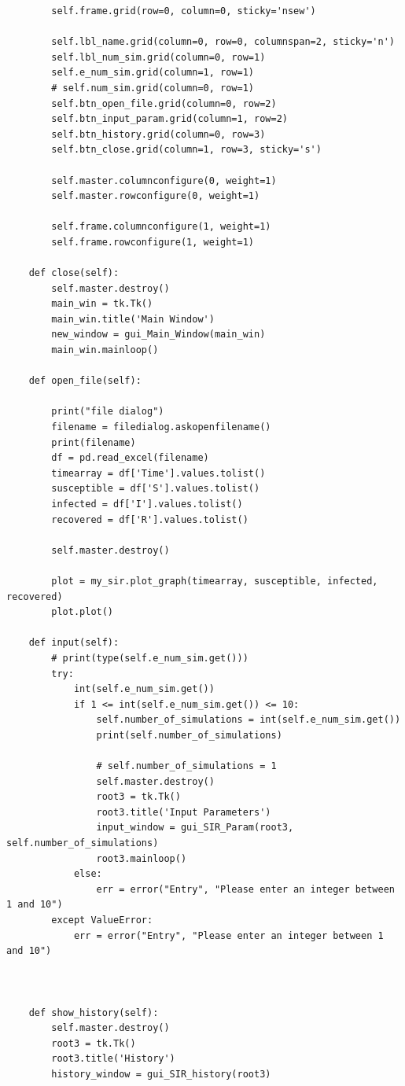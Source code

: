 \documentclass[11pt, a4paper]{article}
\begin{document}
\begin{lstlisting}
        self.frame.grid(row=0, column=0, sticky='nsew')

        self.lbl_name.grid(column=0, row=0, columnspan=2, sticky='n')
        self.lbl_num_sim.grid(column=0, row=1)
        self.e_num_sim.grid(column=1, row=1)
        # self.num_sim.grid(column=0, row=1)
        self.btn_open_file.grid(column=0, row=2)
        self.btn_input_param.grid(column=1, row=2)
        self.btn_history.grid(column=0, row=3)
        self.btn_close.grid(column=1, row=3, sticky='s')

        self.master.columnconfigure(0, weight=1)
        self.master.rowconfigure(0, weight=1)

        self.frame.columnconfigure(1, weight=1)
        self.frame.rowconfigure(1, weight=1)

    def close(self):
        self.master.destroy()
        main_win = tk.Tk()
        main_win.title('Main Window')
        new_window = gui_Main_Window(main_win)
        main_win.mainloop()

    def open_file(self):

        print("file dialog")
        filename = filedialog.askopenfilename()
        print(filename)
        df = pd.read_excel(filename)
        timearray = df['Time'].values.tolist()
        susceptible = df['S'].values.tolist()
        infected = df['I'].values.tolist()
        recovered = df['R'].values.tolist()

        self.master.destroy()

        plot = my_sir.plot_graph(timearray, susceptible, infected, recovered)
        plot.plot()

    def input(self):
        # print(type(self.e_num_sim.get()))
        try:
            int(self.e_num_sim.get())
            if 1 <= int(self.e_num_sim.get()) <= 10:
                self.number_of_simulations = int(self.e_num_sim.get())
                print(self.number_of_simulations)

                # self.number_of_simulations = 1
                self.master.destroy()
                root3 = tk.Tk()
                root3.title('Input Parameters')
                input_window = gui_SIR_Param(root3, self.number_of_simulations)
                root3.mainloop()
            else:
                err = error("Entry", "Please enter an integer between 1 and 10")
        except ValueError:
            err = error("Entry", "Please enter an integer between 1 and 10")



    def show_history(self):
        self.master.destroy()
        root3 = tk.Tk()
        root3.title('History')
        history_window = gui_SIR_history(root3)



\end{lstlisting}
\end{document}
